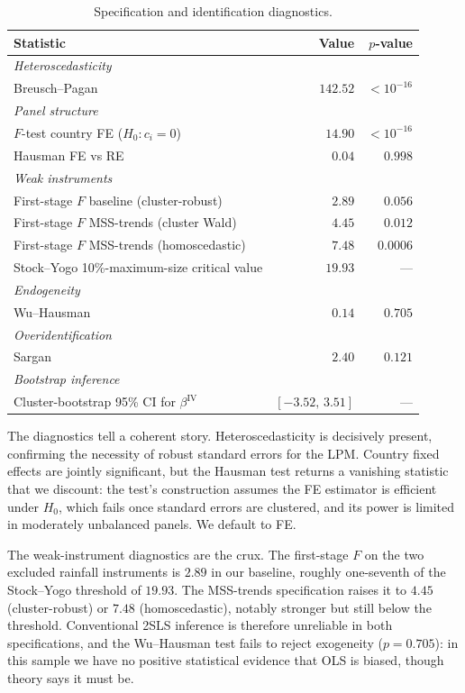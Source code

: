 \documentclass[11pt,a4paper]{article}
\begin{document}
\begin{table}[H]
\centering
\caption{Specification and identification diagnostics.}
\label{tab:diag}
\small
\begin{tabular}{lrr}
\toprule
Statistic & Value & $p$-value \\
\midrule
\textit{Heteroscedasticity} & & \\
Breusch--Pagan                                       & $142.52$ & $<10^{-16}$ \\
\textit{Panel structure} & & \\
$F$-test country FE ($H_0\colon c_i=0$)              & $14.90$  & $<10^{-16}$ \\
Hausman FE vs RE                                     & $0.04$   & $0.998$ \\
\textit{Weak instruments} & & \\
First-stage $F$ baseline (cluster-robust)            & $2.89$   & $0.056$ \\
First-stage $F$ MSS-trends (cluster Wald)            & $4.45$   & $0.012$ \\
First-stage $F$ MSS-trends (homoscedastic)           & $7.48$   & $0.0006$ \\
Stock--Yogo 10\%-maximum-size critical value         & $19.93$  & --- \\
\textit{Endogeneity} & & \\
Wu--Hausman                                          & $0.14$   & $0.705$ \\
\textit{Overidentification} & & \\
Sargan                                               & $2.40$   & $0.121$ \\
\textit{Bootstrap inference} & & \\
Cluster-bootstrap 95\% CI for $\beta^{\text{IV}}$    & $[-3.52,\,3.51]$ & --- \\
\bottomrule
\end{tabular}
\end{table}

The diagnostics tell a coherent story. Heteroscedasticity is decisively
present, confirming the necessity of robust standard errors for the LPM.
Country fixed effects are jointly significant, but the Hausman test
returns a vanishing statistic that we discount: the test's construction
assumes the FE estimator is efficient under $H_0$, which fails once
standard errors are clustered, and its power is limited in moderately
unbalanced panels. We default to FE.

The weak-instrument diagnostics are the crux. The first-stage $F$ on
the two excluded rainfall instruments is $2.89$ in our baseline,
roughly one-seventh of the Stock--Yogo threshold of $19.93$. The
MSS-trends specification raises it to $4.45$ (cluster-robust) or $7.48$
(homoscedastic), notably stronger but still below the threshold.
Conventional 2SLS inference is therefore unreliable in both
specifications, and the Wu--Hausman test fails to reject exogeneity
($p = 0.705$): in this sample we have no positive statistical evidence
that OLS is biased, though theory says it must be.
\end{document}
